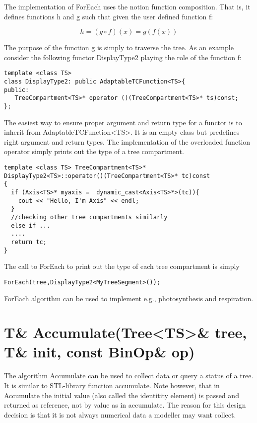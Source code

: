 The implementation of ForEach uses   the notion function  composition.
That is, it defines functions h and g such that given the user defined
function f:

\begin{displaymath}
h = (g \circ f)(x) = g(f(x))
\end{displaymath}

The purpose of the function g is  simply to traverse  the tree.  As an
example consider the  following functor DisplayType2 playing  the role
of the function f:

\begin{verbatim}
template <class TS>
class DisplayType2: public AdaptableTCFunction<TS>{
public:
   TreeCompartment<TS>* operator ()(TreeCompartment<TS>* ts)const;
};
\end{verbatim}

The easiest  way  to ensure proper   argument  and return  type  for a
functor  is to inherit from  AdaptableTCFunction<TS>.   It is an empty
class   but predefines   right    argument  and return   types.    The
implementation of  the overloaded function  operator simply prints out
the type of a tree compartment.

\begin{verbatim}
template <class TS> TreeCompartment<TS>* 
DisplayType2<TS>::operator()(TreeCompartment<TS>* tc)const
{
  if (Axis<TS>* myaxis =  dynamic_cast<Axis<TS>*>(tc)){
    cout << "Hello, I'm Axis" << endl;
  }
  //checking other tree compartments similarly
  else if ...  
  ....
  return tc;
}
\end{verbatim}

The call to ForEach to print out the type of each tree compartment is
simply 

\begin{verbatim}
ForEach(tree,DisplayType2<MyTreeSegment>());
\end{verbatim}

ForEach algorithm  can be used  to implement e.g.,  photosynthesis and
respiration.

\section{T& Accumulate(Tree<TS>\& tree, T\& init, const BinOp\& op)}

The algorithm Accumulate can be used to collect data or query a status
of a tree. It  is  similar to STL-library  function  accumulate.  Note
however,  that  in  Accumulate  the  initial  value (also  called  the
identitity element) is passed and returned  as reference, not by value
as in accumulate.  The  reason for this design  decision is that it is
not always numerical data a modeller may want collect.

